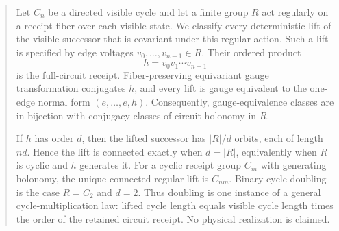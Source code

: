 \begin{abstract}
Let $C_n$ be a directed visible cycle and let a finite group $R$ act
regularly on a receipt fiber over each visible state. We classify every
deterministic lift of the visible successor that is covariant under this
regular action. Such a lift is specified by edge voltages
$v_0,\ldots,v_{n-1}\in R$. Their ordered product
\[
h=v_0v_1\cdots v_{n-1}
\]
is the full-circuit receipt. Fiber-preserving equivariant gauge transformation
conjugates $h$, and every lift is gauge equivalent to the one-edge normal
form $(e,\ldots,e,h)$. Consequently, gauge-equivalence classes are in
bijection with conjugacy classes of circuit holonomy in $R$.

If $h$ has order $d$, then the lifted successor has $|R|/d$ orbits, each of
length $nd$. Hence the lift is connected exactly when $d=|R|$, equivalently
when $R$ is cyclic and $h$ generates it. For a cyclic receipt group $C_m$
with generating holonomy, the unique connected regular lift is $C_{nm}$.
Binary cycle doubling is the case $R=C_2$ and $d=2$. Thus doubling is one
instance of a general cycle-multiplication law: lifted cycle length equals
visible cycle length times the order of the retained circuit receipt. No
physical realization is claimed.
\end{abstract}

